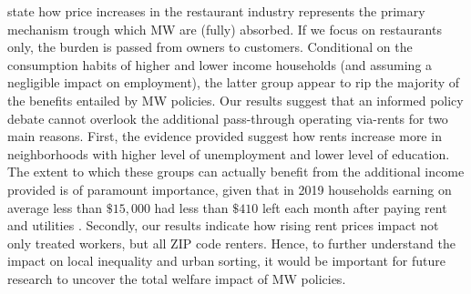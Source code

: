 \textcite{allegretto2018local} state how price increases in the restaurant industry represents the primary mechanism
trough which MW are (fully) absorbed.  If we focus on restaurants only, the burden is passed from owners to customers. 
Conditional on the consumption habits of higher and lower income households (and assuming a negligible impact on 
employment), the latter group appear to rip the majority of the benefits entailed by MW policies. Our results suggest that 
an informed policy debate cannot overlook the additional pass-through operating via-rents for two main reasons. 
First, the evidence provided suggest how rents increase more in neighborhoods with higher level of unemployment and 
lower level of education. The extent to which these groups can actually benefit from the additional income provided 
is of paramount importance, given that in 2019 households earning on average less than $\$15,000$ 
had less than $\$410$ left each month after paying rent and utilities \parencite{fernald2020americas}. Secondly, our 
results indicate how rising rent prices impact not only treated workers, but all ZIP code renters. Hence, to 
further understand the impact on local inequality and urban sorting, it would be important for future 
research to uncover the total welfare impact of MW policies. 




 